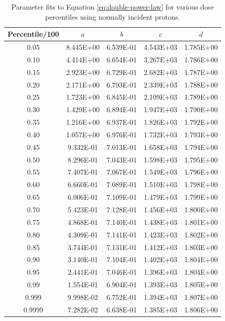 \documentclass{hitec}
\begin{document}
\begin{table}[!h]\centering
	\caption{Parameter fits to Equation \eqref{eq:double-power-law} for various dose percentiles using normally incident protons.}\label{tab:double-power-law-parameters}
	\begin{tabular}{|c | c | c | c | c |}\hline
		Percentile/100 & $a$ & $b$ & $c$ & $d$ \\\hline

0.05&8.445E+00&6.539E-01&4.543E+03&1.785E+00\\\hline
0.10&4.414E+00&6.654E-01&3.267E+03&1.786E+00\\\hline
0.15&2.923E+00&6.729E-01&2.682E+03&1.787E+00\\\hline
0.20&2.171E+00&6.793E-01&2.339E+03&1.788E+00\\\hline
0.25&1.723E+00&6.845E-01&2.109E+03&1.789E+00\\\hline
0.30&1.429E+00&6.894E-01&1.947E+03&1.790E+00\\\hline
0.35&1.216E+00&6.937E-01&1.826E+03&1.792E+00\\\hline
0.40&1.057E+00&6.976E-01&1.732E+03&1.793E+00\\\hline
0.45&9.332E-01&7.013E-01&1.658E+03&1.794E+00\\\hline
0.50&8.296E-01&7.043E-01&1.598E+03&1.795E+00\\\hline
0.55&7.407E-01&7.067E-01&1.549E+03&1.796E+00\\\hline
0.60&6.660E-01&7.089E-01&1.510E+03&1.798E+00\\\hline
0.65&6.006E-01&7.109E-01&1.479E+03&1.799E+00\\\hline
0.70&5.423E-01&7.128E-01&1.456E+03&1.800E+00\\\hline
0.75&4.868E-01&7.140E-01&1.438E+03&1.801E+00\\\hline
0.80&4.309E-01&7.141E-01&1.423E+03&1.802E+00\\\hline
0.85&3.744E-01&7.131E-01&1.412E+03&1.803E+00\\\hline
0.90&3.140E-01&7.104E-01&1.402E+03&1.804E+00\\\hline
0.95&2.441E-01&7.046E-01&1.396E+03&1.804E+00\\\hline
0.99&1.554E-01&6.904E-01&1.393E+03&1.805E+00\\\hline
0.999&9.998E-02&6.752E-01&1.394E+03&1.807E+00\\\hline
0.9999&7.282E-02&6.638E-01&1.385E+03&1.806E+00\\\hline

	\end{tabular}
\end{table}
\end{document}
